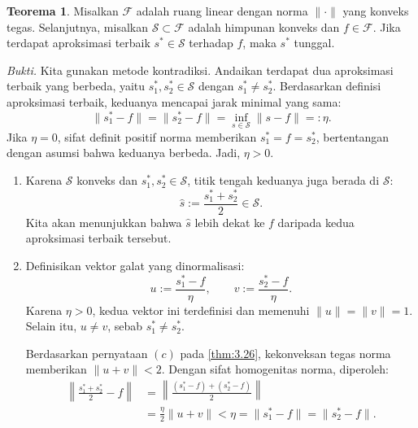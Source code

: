 \documentclass[aspectratio=169,11pt]{beamer}
\theoremstyle{definition}
\newtheorem{teorema}{Teorema}
\newcommand{\myref}[1]{\hyperref[#1]{\nameCref{#1} \ref*{#1}}}
\begin{document}
\begin{frame}[allowframebreaks=1]{\insertsection}{\insertsubsection}
  \setcounter{teorema}{36}
  \begin{teorema}
    Misalkan $\mathcal{F}$ adalah ruang linear dengan norma $\|\cdot\|$ yang konveks tegas. Selanjutnya, misalkan $\mathcal{S}\subset\mathcal{F}$ adalah himpunan konveks dan $f\in\mathcal{F}$. Jika terdapat aproksimasi terbaik $s^*\in\mathcal{S}$ terhadap $f$, maka $s^*$ tunggal.\label{thm:3.37}
  \end{teorema}

  \textit{Bukti.}
  Kita gunakan metode kontradiksi. Andaikan terdapat dua aproksimasi terbaik yang berbeda, yaitu $s_1^*,s_2^*\in\mathcal{S}$ dengan $s_1^*\neq s_2^*$. Berdasarkan definisi aproksimasi terbaik, keduanya mencapai jarak minimal yang sama:
  \begin{equation*}
    \|s_1^*-f\|=\|s_2^*-f\|
    =\inf_{s\in\mathcal{S}}\|s-f\|=: \eta.
  \end{equation*}
  Jika $\eta=0$, sifat definit positif norma memberikan $s_1^*=f=s_2^*$, bertentangan dengan asumsi bahwa keduanya berbeda. Jadi, $\eta>0$.

  \begin{enumerate}
    \item Karena $\mathcal{S}$ konveks dan $s_1^*,s_2^*\in\mathcal{S}$, titik tengah keduanya juga berada di $\mathcal{S}$:
          \begin{equation*}
            \widehat{s}:=\frac{s_1^*+s_2^*}{2}\in\mathcal{S}.
          \end{equation*}
          Kita akan menunjukkan bahwa $\widehat{s}$ lebih dekat ke $f$ daripada kedua aproksimasi terbaik tersebut.

    \item Definisikan vektor galat yang dinormalisasi:
          \begin{equation*}
            u:=\frac{s_1^*-f}{\eta}, \qquad
            v:=\frac{s_2^*-f}{\eta}.
          \end{equation*}
          Karena $\eta>0$, kedua vektor ini terdefinisi dan memenuhi $\|u\|=\|v\|=1$. Selain itu, $u\neq v$, sebab $s_1^*\neq s_2^*$.

          Berdasarkan pernyataan $(c)$ pada \myref{thm:3.26}, kekonveksan tegas norma memberikan $\|u+v\|<2$. Dengan sifat homogenitas norma, diperoleh:
          \setcounter{equation}{27}
          \begin{equation}
            \begin{aligned}
              \left\|\frac{s_1^*+s_2^*}{2}-f\right\|
               & =\left\|\frac{(s_1^*-f)+(s_2^*-f)}{2}\right\| \\
               & =\frac{\eta}{2}\|u+v\|
              <\eta=\|s_1^*-f\|=\|s_2^*-f\|.
            \end{aligned}\label{eq:3.28}
          \end{equation}


\end{enumerate}
\end{frame}
\end{document}
